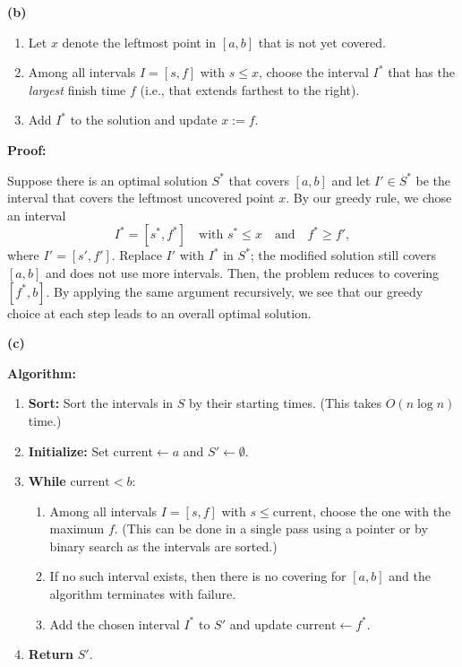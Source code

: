 \documentclass[11pt]{article}
\begin{document}
    \bigskip
    \noindent\textbf{(b)}
    \medskip
    \begin{enumerate}
        \item Let \(x\) denote the leftmost point in \([a,b]\) that is not yet covered.
        \item Among all intervals \(I = [s,f]\) with \(s \le x\), choose the interval \(I^*\) that has the \emph{largest} finish time \(f\) (i.e., that extends farthest to the right).
        \item Add \(I^*\) to the solution and update \(x := f\).
    \end{enumerate}
    
    \medskip
    \noindent\textbf{Proof:} 
    
    Suppose there is an optimal solution \(S^*\) that covers \([a,b]\) and let \(I'\in S^*\) be the interval that covers the leftmost uncovered point \(x\). By our greedy rule, we chose an interval 
    \[
    I^* = [s^*,f^*] \quad \text{with } s^*\le x \quad \text{and} \quad f^* \ge f',
    \]
    where \(I' = [s',f']\). Replace \(I'\) with \(I^*\) in \(S^*\); the modified solution still covers \([a,b]\) and does not use more intervals. Then, the problem reduces to covering \([f^*,b]\). By applying the same argument recursively, we see that our greedy choice at each step leads to an overall optimal solution.
    
    \bigskip
    \noindent\textbf{(c)}
    
    \medskip
    \noindent\textbf{Algorithm:}
    \begin{enumerate}
        \item \textbf{Sort:} Sort the intervals in \(S\) by their starting times. (This takes \(O(n \log n)\) time.)
        \item \textbf{Initialize:} Set \(\text{current} \leftarrow a\) and \(S' \leftarrow \emptyset\).
        \item \textbf{While} \(\text{current} < b\):
        \begin{enumerate}
            \item Among all intervals \(I = [s,f]\) with \(s \le \text{current}\), choose the one with the maximum \(f\). (This can be done in a single pass using a pointer or by binary search as the intervals are sorted.)
            \item If no such interval exists, then there is no covering for \([a,b]\) and the algorithm terminates with failure.
            \item Add the chosen interval \(I^*\) to \(S'\) and update \(\text{current} \leftarrow f^*\).
        \end{enumerate}
        \item \textbf{Return} \(S'\).
    \end{enumerate}
    
\end{document}
